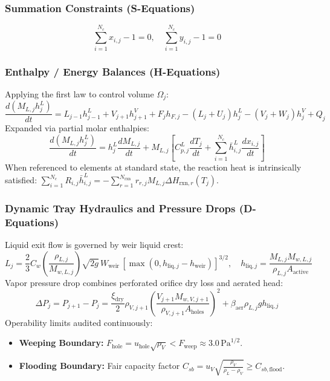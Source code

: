 \documentclass[11pt,a4paper]{article}
\begin{document}
\subsubsection{Summation Constraints (S-Equations)}
\begin{equation}
\sum_{i=1}^{N_c} x_{i,j} - 1 = 0, \quad \sum_{i=1}^{N_c} y_{i,j} - 1 = 0
\end{equation}

\subsubsection{Enthalpy / Energy Balances (H-Equations)}
Applying the first law to control volume $\Omega_j$:
\begin{equation}
\frac{d (M_{L,j} h_j^L)}{dt} = L_{j-1} h_{j-1}^L + V_{j+1} h_{j+1}^V + F_j h_{F,j} - (L_j + U_j) h_j^L - (V_j + W_j) h_j^V + Q_j
\end{equation}
Expanded via partial molar enthalpies:
\begin{equation}
\frac{d (M_{L,j} h_j^L)}{dt} = h_j^L \frac{d M_{L,j}}{dt} + M_{L,j} \left[ C_{p,j}^L \frac{d T_j}{dt} + \sum_{i=1}^{N_c} \bar{h}_{i,j}^L \frac{d x_{i,j}}{dt} \right]
\end{equation}
When referenced to elements at standard state, the reaction heat is intrinsically satisfied: $\sum_{i=1}^{N_c} R_{i,j} \bar{h}_{i,j}^L = -\sum_{r=1}^{N_{\text{rxn}}} r_{r,j} M_{L,j} \Delta H_{\text{rxn},r}(T_j)$.

\subsubsection{Dynamic Tray Hydraulics and Pressure Drops (D-Equations)}
Liquid exit flow is governed by weir liquid crest:
\begin{equation}
L_j = \frac{2}{3} C_w \left( \frac{\rho_{L,j}}{M_{w,L,j}} \right) \sqrt{2 g} \, W_{\text{weir}} \, \left[ \max\left(0, h_{\text{liq},j} - h_{\text{weir}}\right) \right]^{3/2}, \quad h_{\text{liq},j} = \frac{M_{L,j} M_{w,L,j}}{\rho_{L,j} A_{\text{active}}}
\end{equation}
Vapor pressure drop combines perforated orifice dry loss and aerated head:
\begin{equation}
\Delta P_j = P_{j+1} - P_j = \frac{\xi_{\text{dry}}}{2} \rho_{V,j+1} \left( \frac{V_{j+1} M_{w,V,j+1}}{\rho_{V,j+1} A_{\text{holes}}} \right)^2 + \beta_{\text{aer}} \rho_{L,j} g h_{\text{liq},j}
\end{equation}
Operability limits audited continuously:
\begin{itemize}[leftmargin=*]
    \item \textbf{Weeping Boundary:} $F_{\text{hole}} = u_{\text{hole}} \sqrt{\rho_V} < F_{\text{weep}} \approx 3.0 \, \text{Pa}^{1/2}$.
    \item \textbf{Flooding Boundary:} Fair capacity factor $C_{sb} = u_V \sqrt{\frac{\rho_V}{\rho_L - \rho_V}} \ge C_{sb,\text{flood}}$.
\end{itemize}
\end{document}
